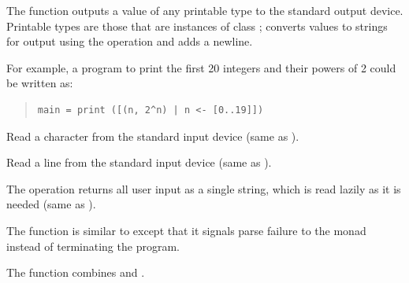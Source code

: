 \begin{haddockdesc}
\item[\begin{tabular}{@{}l}
print :: Show a => a -> IO ()
\end{tabular}]
{\haddockbegindoc
The  function outputs a value of any printable type to the
 standard output device.
 Printable types are those that are instances of class ; 
 converts values to strings for output using the  operation and
 adds a newline.\par
For example, a program to print the first 20 integers and their
 powers of 2 could be written as:\par
\begin{quote}
{\haddockverb\begin{verbatim}
main = print ([(n, 2^n) | n <- [0..19]])\end{verbatim}}
\end{quote}}
\end{haddockdesc}
\begin{haddockdesc}
\item[\begin{tabular}{@{}l}
getChar :: IO Char
\end{tabular}]
{\haddockbegindoc
Read a character from the standard input device
 (same as  ).\par}
\end{haddockdesc}
\begin{haddockdesc}
\item[\begin{tabular}{@{}l}
getLine :: IO String
\end{tabular}]
{\haddockbegindoc
Read a line from the standard input device
 (same as  ).\par}
\end{haddockdesc}
\begin{haddockdesc}
\item[\begin{tabular}{@{}l}
getContents :: IO String
\end{tabular}]
{\haddockbegindoc
The  operation returns all user input as a single string,
 which is read lazily as it is needed
 (same as  ).\par}
\end{haddockdesc}
\begin{haddockdesc}
\item[\begin{tabular}{@{}l}
readIO :: Read a => String -> IO a
\end{tabular}]
{\haddockbegindoc
The  function is similar to  except that it signals
 parse failure to the  monad instead of terminating the program.\par}
\end{haddockdesc}
\begin{haddockdesc}
\item[\begin{tabular}{@{}l}
readLn :: Read a => IO a
\end{tabular}]
{\haddockbegindoc
The  function combines  and .\par}
\end{haddockdesc}